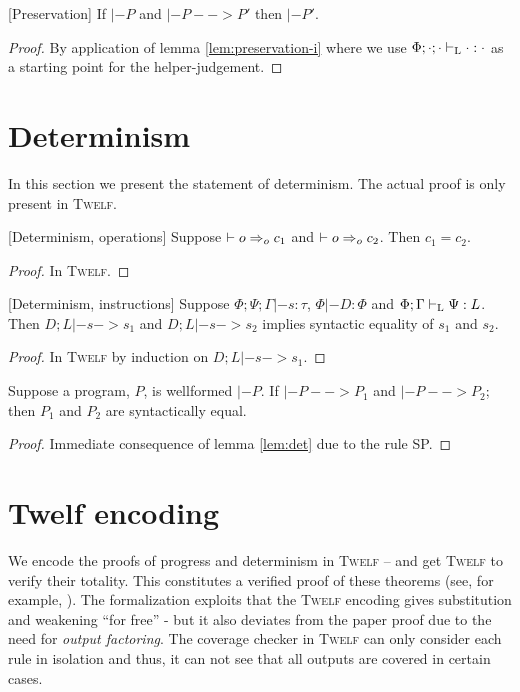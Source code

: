 \documentclass[a4paper, oneside, 10pt, draft]{memoir}
\newcommand{\twelf}{\textsc{Twelf}}
\begin{document}
\begin{thm}{[Preservation]}
  \label{thm:preservation}
  If $|- P$ and $|- P --> P'$ then $|- P'$.
\end{thm}
\begin{proof}
  By application of lemma \ref{lem:preservation-i} where we use
  $\Phi;\cdot;\cdot |-_{\mathrm{L}} \cdot : \cdot$ as a starting point for the
  helper-judgement.
\end{proof}
\section{Determinism}

In this section we present the statement of determinism. The actual
proof is only present in \twelf{}.

\begin{lem}{[Determinism, operations]}
  \label{lem:det-op}
  Suppose $|- o =>_{o} c_1$ and $|- o =>_{o} c_2$. Then $c_1 = c_2$.
\end{lem}
\begin{proof}
  In \twelf{}.
\end{proof}

\begin{lem}{[Determinism, instructions]}
  \label{lem:det}
  Suppose $\Phi;\Psi;\Gamma |- s : \tau$, $\Phi |- D : \Phi$ and
  $\Phi;\Gamma |-_{\mathrm{L}} \Psi : L$. Then $D;L |- s -> s_1$ and $D;L |- s
  -> s_2$ implies syntactic equality of $s_1$ and $s_2$.
\end{lem}
\begin{proof}
  In \twelf{} by induction on $D;L |- s -> s_1$.
\end{proof}
\begin{thm}[Determinism]
  \label{thm:det-pgm}
  Suppose a program, $P$, is wellformed $|- P$. If $|- P --> P_1$
  and $|- P --> P_2$; then $P_1$ and $P_2$ are syntactically equal.
\end{thm}
\begin{proof}
 Immediate consequence of lemma \ref{lem:det} due to the rule SP.
\end{proof}

\section{Twelf encoding}

We encode the proofs of progress and determinism in \twelf{} -- and
get \twelf{} to verify their totality. This constitutes a verified
proof of these theorems (see, for example,
\cite{harper.crary:2005:how}). The formalization exploits that the
\twelf{} encoding gives substitution and weakening ``for free'' - but
it also deviates from the paper proof due to the need for \emph{output
  factoring}. The coverage checker in \twelf{} can only consider each
rule in isolation and thus, it can not see that all outputs are
covered in certain cases.
\end{document}
